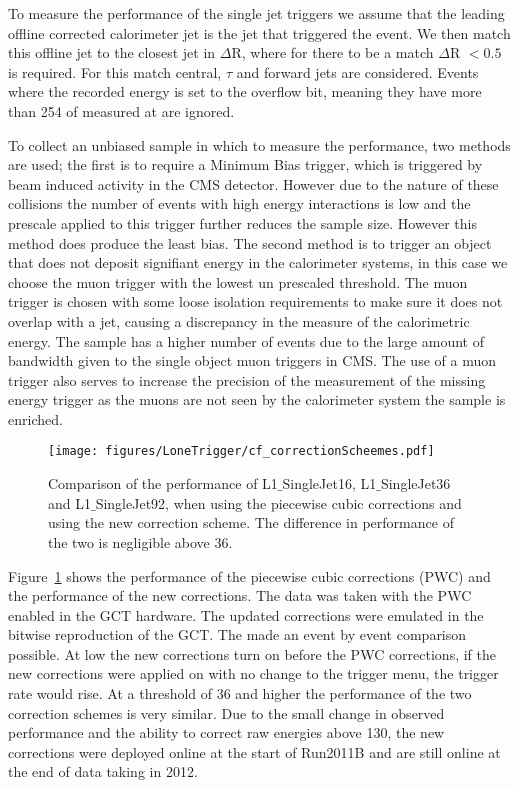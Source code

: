 To measure the performance of the \Lone single jet triggers we assume that the 
leading offline corrected \AK calorimeter jet is the jet that triggered the 
event. We then match this offline jet to the closest \Lone jet in $\Delta$R, 
where for there to be a match $\Delta$R $< 0.5$ is required. For this match 
central, $\tau$ and forward jets are considered. Events where the recorded 
\Lone energy is set to the overflow bit, meaning they have more than 
\unit{254}{\GeV} of \ET measured at \Lone are ignored.

To collect an unbiased sample in which to measure the performance, two 
methods are used; the first is to require a Minimum Bias trigger, which is 
triggered by beam induced activity in the CMS detector.
However due to the nature of these collisions the number of events with high 
energy interactions is low and the prescale applied to this trigger further 
reduces the sample size. However this method does produce the least bias.
The second method is to trigger an object that does not deposit signifiant 
energy in the calorimeter systems, in this case we choose the muon trigger with 
the lowest un prescaled \PT threshold. The muon trigger is chosen with some 
loose isolation requirements to make sure it does not overlap with a jet, 
causing a discrepancy in the measure of the calorimetric energy. The sample has 
a higher number of events due to the large amount of bandwidth given to the 
single object muon triggers in CMS. The use of a muon trigger also serves to 
increase the precision of the measurement of the \Lone missing energy trigger 
as the muons are not seen by the calorimeter system the \MET sample is enriched.

\begin{figure}[htbp]
  \centering
    \texttt{[image: figures/LoneTrigger/cf\_correctionScheemes.pdf]}
  \caption{Comparison of the performance of L1$\_$SingleJet16, L1$\_$SingleJet36 and L1$\_$SingleJet92, when using the piecewise cubic corrections and using the new correction scheme. The difference in performance of the two is negligible above 36\GeV.}
  \label{fig:figures_LoneTrigger_cf_correctionScheemes}
\end{figure}

Figure~\ref{fig:figures_LoneTrigger_cf_correctionScheemes} shows the 
performance of the piecewise cubic corrections (PWC) and the performance of the 
new corrections. The data was taken with the PWC enabled in the GCT hardware. 
The updated corrections were emulated in the bitwise reproduction of the GCT. 
The made an event by event comparison possible. At low \ET the new corrections 
turn on before the PWC corrections, if the new corrections were applied on with 
no change to the trigger menu, the \Lone trigger rate would rise. At a 
threshold of \unit{36}{\GeV} and higher the performance of the two correction 
schemes is very similar. Due to the small change in observed performance and 
the ability to correct raw energies above \unit{130}{\GeV}, the new corrections 
were deployed online at the start of Run2011B and are still online at the end 
of data taking in 2012.

